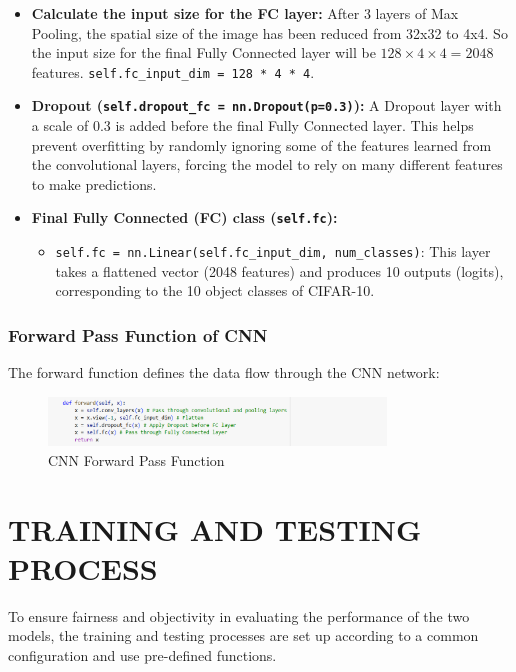 \documentclass[12pt]{article}
\begin{document}
\begin{itemize}
\begin{itemize}
\begin{itemize}
        \end{itemize}
    \end{itemize}
    \item \textbf{Calculate the input size for the FC layer:} After 3 layers of Max Pooling, the spatial size of the image has been reduced from 32x32 to 4x4. So the input size for the final Fully Connected layer will be $128 \times 4 \times 4 = 2048$ features. \texttt{self.fc\_input\_dim = 128 * 4 * 4}.
    \item \textbf{Dropout (\texttt{self.dropout\_fc = nn.Dropout(p=0.3)}):} A Dropout layer with a scale of 0.3 is added before the final Fully Connected layer. This helps prevent overfitting by randomly ignoring some of the features learned from the convolutional layers, forcing the model to rely on many different features to make predictions.
    \item \textbf{Final Fully Connected (FC) class (\texttt{self.fc}):}
    \begin{itemize}
        \item \texttt{self.fc = nn.Linear(self.fc\_input\_dim, num\_classes)}: This layer takes a flattened vector (2048 features) and produces 10 outputs (logits), corresponding to the 10 object classes of CIFAR-10.
    \end{itemize}
\end{itemize}

\subsubsection{Forward Pass Function of CNN}
The forward function defines the data flow through the CNN network:
\begin{figure}[H]
    \centering
    \includegraphics[width=0.8\textwidth]{Screenshots/Ảnh chụp màn hình 2025-05-23 222100.png} %
    \caption{CNN Forward Pass Function}
    \label{fig:cnn_forward_pass}
\end{figure}

\section{TRAINING AND TESTING PROCESS}
To ensure fairness and objectivity in evaluating the performance of the two models, the training and testing processes are set up according to a common configuration and use pre-defined functions.
\end{document}
